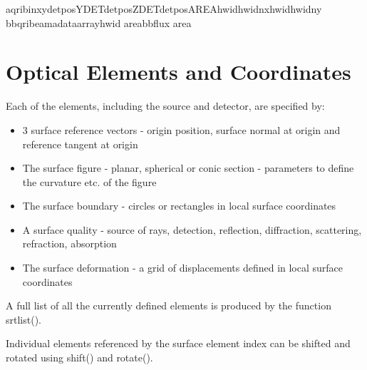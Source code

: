 \documentclass[letterpaper,10pt,english]{sphinxmanual}
\begin{document}
\begin{sphinxVerbatim}[commandchars=\\\{\}]
aqri\PYGZus{}binxydetposYDETdetposZDETdetposAREAhwidhwidnxhwidhwidny
bbqri\PYGZus{}beamadata\PYGZus{}arrayhwid
areabbflux
area
\end{sphinxVerbatim}


\section{Optical Elements and Coordinates}
\label{\detokenize{xsrt_elements:optical-elements-and-coordinates}}\label{\detokenize{xsrt_elements::doc}}
Each of the elements, including the source and detector, are specified
by:
\begin{itemize}
\item {} 
3 surface reference vectors - origin position, surface normal at origin and reference tangent at origin

\item {} 
The surface figure - planar, spherical or conic section - parameters to define the curvature etc. of the figure

\item {} 
The surface boundary - circles or rectangles in local surface coordinates

\item {} 
A surface quality - source of rays, detection, reflection, diffraction, scattering, refraction, absorption

\item {} 
The surface deformation - a grid of displacements defined in local surface coordinates

\end{itemize}

A full list of all the currently defined elements is produced by the
function srtlist().

Individual elements referenced by the surface element index
can be shifted and rotated using shift() and rotate().
\end{document}

